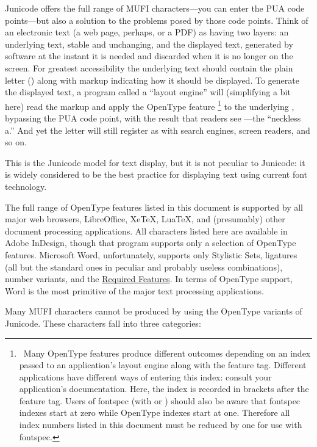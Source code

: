 Junicode offers the full range of MUFI characters---you can enter the PUA code points---but also a solution to the
problems posed by those code points. Think of an electronic text (a web page, perhaps, or a PDF) as having two layers:
an underlying text, stable and unchanging, and the displayed text, generated by software at the instant it is needed
and discarded when it is no longer on the screen. For greatest accessibility the underlying text should contain the
plain letter  () along with markup indicating how it should be displayed. To generate
the displayed text, a program called a ``layout engine'' will (simplifying a bit here) read the markup and apply the
OpenType feature \footnote{\ Many OpenType features produce different outcomes depending on
an index passed to an application’s layout engine along with the feature tag. Different applications have different
ways of entering this index: consult your application’s documentation. Here, the index is recorded in brackets after
the feature tag. Users of fontspec (with {\XeLaTeX} or {\LuaTeX}) should also be aware that fontspec indexes start at zero
while OpenType indexes start at one. Therefore all index numbers listed in this document must be reduced by one for
use with fontspec.\par } to the underlying , bypassing the PUA code point, with the result that
readers see ---the ``neckless a.'' And yet the letter will still register as
 with search engines, screen readers, and so on.

This is the Junicode model for text display, but it is not peculiar to Junicode: it is widely considered to be the best
practice for displaying text using current font technology.

The full range of OpenType features listed in this document is supported by all major web browsers, LibreOffice, XeTeX,
LuaTeX, and (presumably) other document processing applications. All characters listed here are available in Adobe
InDesign, though that program supports only a selection of OpenType features. Microsoft Word, unfortunately, supports
only Stylistic Sets, ligatures (all but the standard ones in peculiar and probably useless combinations), number
variants, and the \hyperlink{req}{Required Features}. In terms of
OpenType support, Word is the most primitive of the major text processing applications.

Many MUFI characters cannot be produced by using the OpenType variants of Junicode. These characters fall into three
categories:

